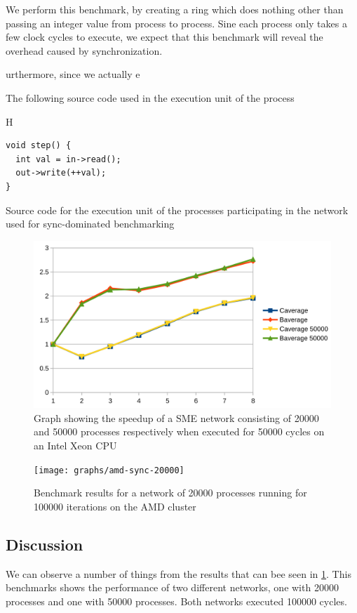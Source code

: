 We perform this benchmark, by creating a ring which does nothing other
than passing an integer value from process to process. Sine each
process only takes a few clock cycles to execute, we expect that this
benchmark will reveal the overhead caused by synchronization.

urthermore, since we actually 
e

The following source code used in the execution unit of the process
\begin{listing}{H}
\begin{verbatim}
void step() {
  int val = in->read();
  out->write(++val);
}
\end{verbatim}
\caption{Source code for the execution unit of the processes
  participating in the network used for sync-dominated benchmarking}
\end{listing}

\begin{figure}
\centering
\includegraphics{graphs/graphone}
\caption[Benchmark graph]{Graph showing the speedup of a SME network
  consisting of 20000 and 50000 processes respectively when executed
  for 50000 cycles on an Intel Xeon CPU}
\label{fig:intel-sync}
\end{figure}

\begin{figure}
\centering
\texttt{[image: graphs/amd-sync-20000]}
\caption[Synchronization-dominated benchmark on AMD cluster]{Benchmark results for a network of 20000 processes running
for 100000 iterations on the AMD cluster}
\label{fig:amd-sync}
\end{figure}


\subsection{Discussion}
We can observe a number of things from the results that can bee seen
in \cref{fig:intel-sync}.  This benchmarks shows the performance of
two different networks, one with 20000 processes and one with 50000
processes. Both networks executed 100000 cycles.


